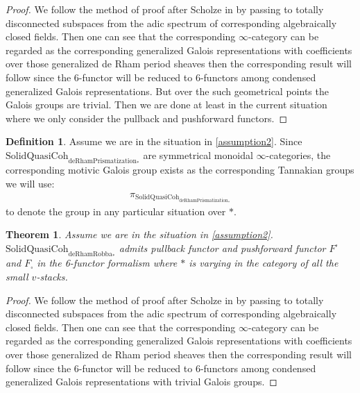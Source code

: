 \documentclass[12pt]{article}
\newtheorem{theorem}{Theorem}
\theoremstyle{definition}
\newtheorem{definition}{Definition}
\begin{document}
\begin{proof}
We follow the method of proof after Scholze in \cite{1S5} by passing to totally disconnected subspaces from the adic spectrum of corresponding algebraically closed fields. Then one can see that the corresponding $\infty$-category can be regarded as the corresponding generalized Galois representations with coefficients over those generalized de Rham period sheaves then the corresponding result will follow since the 6-functor will be reduced to 6-functors among condensed generalized Galois representations. But over the such geometrical points the Galois groups are trivial. Then we are done at least in the current situation where we only consider the pullback and pushforward functors.
\end{proof}

\begin{definition}
Assume we are in the situation in \cref{assumption2}. Since $\mathrm{SolidQuasiCoh}_{\mathrm{deRhamPrismatization}_*}$ are symmetrical monoidal $\infty$-categories, the corresponding motivic Galois group exists as the corresponding Tannakian groups we will use:
\begin{align}
\pi_{\mathrm{SolidQuasiCoh}_{\mathrm{deRhamPrismatization}_*}}
\end{align}
to denote the group in any particular situation over $*$.
\end{definition}



\begin{theorem}
Assume we are in the situation in \cref{assumption2}. $\mathrm{SolidQuasiCoh}_{\mathrm{deRhamRobba}_*}$ admits pullback functor and pushforward functor $F^\square$ and $F_\square$ in the 6-functor formalism where $*$ is varying in the category of all the small $v$-stacks.
\end{theorem}

\begin{proof}
We follow the method of proof after Scholze in \cite{1S5} by passing to totally disconnected subspaces from the adic spectrum of corresponding algebraically closed fields. Then one can see that the corresponding $\infty$-category can be regarded as the corresponding generalized Galois representations with coefficients over those generalized de Rham period sheaves then the corresponding result will follow since the 6-functor will be reduced to 6-functors among condensed generalized Galois representations with trivial Galois groups.
\end{proof}
\end{document}
